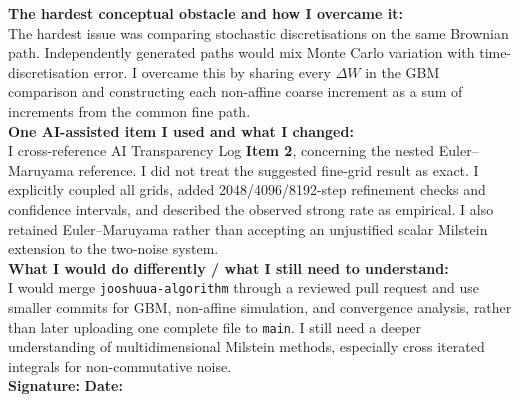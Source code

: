 \documentclass[11pt,a4paper]{article}
\theoremstyle{definition}
\theoremstyle{remark}
\begin{document}
\begin{formbox}
\begin{enumerate}[leftmargin=2em]
\end{enumerate}

\textbf{The hardest conceptual obstacle and how I overcame it:}\\
The hardest issue was comparing stochastic discretisations on the same
Brownian path. Independently generated paths would mix Monte Carlo variation
with time-discretisation error. I overcame this by sharing every
$\Delta W$ in the GBM comparison and constructing each non-affine coarse
increment as a sum of increments from the common fine path.\\[0.4em]

\textbf{One AI-assisted item I used and what I changed:}\\
I cross-reference AI Transparency Log \textbf{Item 2}, concerning the nested
Euler--Maruyama reference. I did not treat the suggested fine-grid result as
exact. I explicitly coupled all grids, added 2048/4096/8192-step refinement
checks and confidence intervals, and described the observed strong rate as
empirical. I also retained Euler--Maruyama rather than accepting an
unjustified scalar Milstein extension to the two-noise system.\\[0.4em]

\textbf{What I would do differently / what I still need to understand:}\\
I would merge \texttt{jooshuua-algorithm} through a reviewed pull request
and use smaller commits for GBM, non-affine simulation, and convergence
analysis, rather than later uploading one complete file to \texttt{main}.
I still need a deeper understanding of multidimensional Milstein methods,
especially cross iterated integrals for non-commutative noise.\\[0.6em]

\textbf{Signature:} \underline{\hspace{4cm}}\qquad
\textbf{Date:} \underline{\hspace{2.5cm}}

\end{formbox}

\newpage
\end{document}
